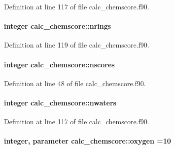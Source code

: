 Definition at line 117 of file calc\-\_\-chemscore.\-f90.

\hypertarget{classcalc__chemscore_a86fcc5a701ba3b1900908778c29fccc1}{
\paragraph[{nrings}]{\setlength{\rightskip}{0pt plus 5cm}integer calc\-\_\-chemscore\-::nrings}}\label{classcalc__chemscore_a86fcc5a701ba3b1900908778c29fccc1}


Definition at line 119 of file calc\-\_\-chemscore.\-f90.

\hypertarget{classcalc__chemscore_a410140d396d152254ee380ca143a2171}{
\paragraph[{nscores}]{\setlength{\rightskip}{0pt plus 5cm}integer calc\-\_\-chemscore\-::nscores}}\label{classcalc__chemscore_a410140d396d152254ee380ca143a2171}


Definition at line 48 of file calc\-\_\-chemscore.\-f90.

\hypertarget{classcalc__chemscore_a9620ce63e8c0a9af29f2e28281526f61}{
\paragraph[{nwaters}]{\setlength{\rightskip}{0pt plus 5cm}integer calc\-\_\-chemscore\-::nwaters}}\label{classcalc__chemscore_a9620ce63e8c0a9af29f2e28281526f61}


Definition at line 117 of file calc\-\_\-chemscore.\-f90.

\hypertarget{classcalc__chemscore_aee2123f93427e62198b19acbe63a1a01}{
\paragraph[{oxygen}]{\setlength{\rightskip}{0pt plus 5cm}integer, parameter calc\-\_\-chemscore\-::oxygen =10}}\label{classcalc__chemscore_aee2123f93427e62198b19acbe63a1a01}



